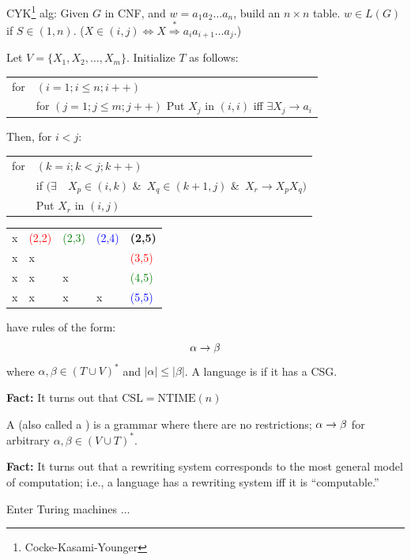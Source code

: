 \begin{frame}
CYK\footnote{Cocke-Kasami-Younger} alg: 
Given $G$ in CNF, and $w=a_1a_2\ldots a_n$,
build an $n\times n$ table.
$w\in L(G)$ if $S\in (1,n)$.  ($X\in(i,j)\iff
X\stackrel{*}{\Rightarrow}a_ia_{i+1}\ldots a_j$.)

Let $V=\{X_1,X_2,\ldots,X_m\}$.  Initialize $T$ as follows:
\begin{tabular}{ll}
for & $(i=1; i\le n; i++)$ \\
    & for $(j=1; j\le m; j++)$
       Put $X_j$ in $(i,i)$ iff $\exists X_j\longrightarrow a_i$
\end{tabular}
Then, for $i<j$:
\begin{tabular}{ll}
for & $(k=i; k<j; k++)$ \\
    & if $(\exists\quad X_p\in (i,k)$ \&\ $X_q\in (k+1,j)$ 
       \&\ $X_r\longrightarrow X_pX_q)$ \\
    & Put $X_r$ in $(i,j)$
\end{tabular}
\footnotesize{%
\begin{tabular}[t]{|p{7mm}|p{7mm}|p{7mm}|p{7mm}|p{7mm}|}\hline
&&&& \\\hline
x&\textcolor{red}{(2,2)}&\textcolor{green}{(2,3)}
&\textcolor{blue}{(2,4)}&{\bf (2,5)} \\\hline
x&x&&&\textcolor{red}{(3,5)} \\\hline
x&x&x&&\textcolor{green}{(4,5)} \\\hline
x&x&x&x&\textcolor{blue}{(5,5)} \\\hline
\end{tabular}}
\end{frame}

\begin{frame}
 have rules of the form:
$$
\alpha\rightarrow\beta
$$
where $\alpha,\beta\in(T\cup V)^*$ and $|\alpha|\le|\beta|$.  A
language is  if it has a CSG.

{\bf Fact:}  It turns out that $\text{CSL}=\text{NTIME}(n)$

A  (also called a ) is a
grammar where there are no restrictions; $\alpha\rightarrow\beta$ for
arbitrary $\alpha,\beta\in(V\cup T)^*$.  

{\bf Fact:}  It turns out that a rewriting system corresponds to the
most general model of computation; i.e., a language has a rewriting
system iff it is ``computable.''

Enter Turing machines $\ldots$
\end{frame}

